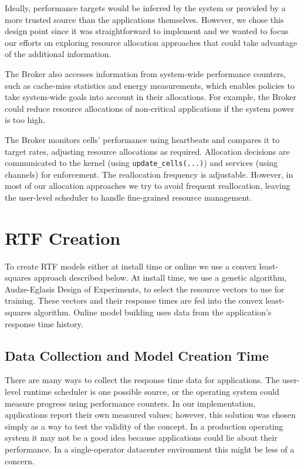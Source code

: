 {Ideally, performance targets would be inferred by the system or provided by a
more trusted source than the applications themselves.  
However, we chose this design point since it was straightforward to implement
and we wanted to focus our efforts on exploring resource allocation approaches
that could take advantage of the additional information.

The Broker also accesses information from system-wide performance
counters, such as cache-miss statistics and energy measurements, which
enables policies to take system-wide goals into account in their
allocations.  For example, the Broker could reduce resource allocations
of non-critical applications if the system power is too high.

The Broker monitors cells' performance using heartbeats and compares it to
target rates, adjusting resource allocations as required.  Allocation
decisions are communicated to the kernel (using \texttt{update\_cells(...)})
and services (using channels) for enforcement.  The reallocation
frequency is adjustable.  However, in most of our allocation
approaches we try to avoid frequent reallocation, leaving the
user-level scheduler to handle fine-grained resource management.

} 
   
 

\section{RTF Creation}\label{rtf_creation}
To create RTF models either at install time or online we use a convex
least-squares approach described below.  At install time, we use a
genetic algorithm, Audze-Eglasis Design of
Experiments\cite{bates-aes03}, to select the resource vectors to use
for training.  These vectors and their response times are fed into the
convex least-squares algorithm. Online model building uses data
from the application's response time history.

\subsection*{Data Collection and Model Creation Time}
There are many ways to collect the response time data for
applications. The user-level runtime scheduler is one possible source,
or the operating system could measure progress using performance
counters.  In our implementation, applications report their own
measured values; however, this solution was chosen simply as a way to
test the validity of the concept.  In a production operating system it
may not be a good idea because applications could lie about their
performance.  In a single-operator datacenter environment this might be less of a concern.


